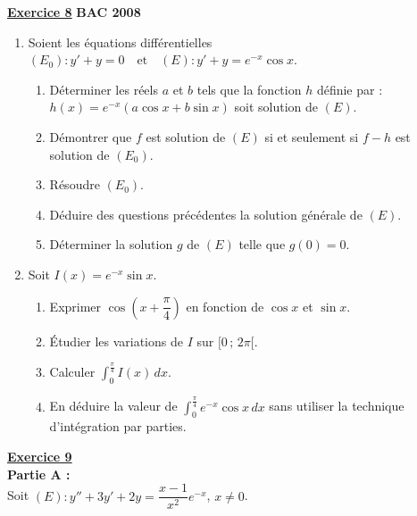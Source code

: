 \documentclass[12pt,a4paper]{article}
\newcommand{\exo}[1]{%
        \textbf{\underline{Exercice #1}}
}
\begin{document}
\begin{multicols}{2}
\exo{8} \textbf{BAC 2008}

\begin{enumerate}
    \item Soient les équations différentielles \\ 
    \( (E_0) : y' + y = 0 \quad \text{et} \quad (E) : y' + y = e^{-x} \cos x \).
    \begin{enumerate}
        \item Déterminer les réels \( a \) et \( b \) tels que la fonction \( h \) définie par : \\ 
        \( h(x) = e^{-x}(a \cos x + b \sin x) \) soit solution de \( (E) \).
        
        \item Démontrer que \( f \) est solution de \( (E) \) si et seulement si \( f - h \) est solution de \( (E_0) \).
        
        \item Résoudre \( (E_0) \).
        
        \item Déduire des questions précédentes la solution générale de \( (E) \).
        
        \item Déterminer la solution \( g \) de \( (E) \) telle que \( g(0) = 0 \).
    \end{enumerate}
    
    \item Soit \( I(x) = e^{-x} \sin x \).
    \begin{enumerate}
        \item Exprimer \( \cos\left(x + \dfrac{\pi}{4}\right) \) en fonction de \( \cos x \) et \( \sin x \).
        
        \item Étudier les variations de \( I \) sur \( [0\,;\,2\pi[ \).
        
        \item Calculer \( \int_0^{\frac{\pi}{4}} I(x) \, dx \).
        
        \item En déduire la valeur de \( \int_0^{\frac{\pi}{4}} e^{-x} \cos x \, dx \)  
        sans utiliser la technique d’intégration par parties.
    \end{enumerate}
\end{enumerate}

\exo{9} \\

\textbf{Partie A :}\\
Soit \( (E) : y'' + 3y' + 2y = \dfrac{x - 1}{x^2} e^{-x} \), \( x \ne 0 \).


\end{multicols}
\end{document}
